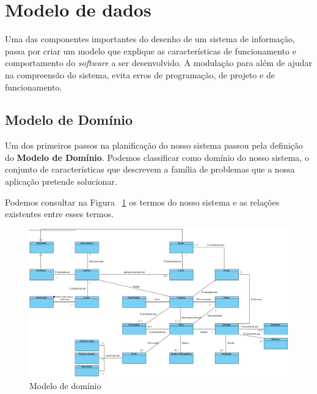 \section{Modelo de dados}

Uma das componentes importantes do desenho de um sistema de informação, passa por criar um modelo que explique as características de funcionamento e comportamento do \textit{software} a ser desenvolvido. A modulação para além de ajudar na compreensão do sistema, evita erros de programação, de projeto e de funcionamento.

\subsection{Modelo de Domínio}

Um dos primeiros passos na planificação do nosso sistema passou pela definição do \textbf{Modelo de Domínio}.
Podemos classificar como domínio do nosso sistema, o conjunto de características que descrevem a família de problemas que a nossa aplicação pretende solucionar.

Podemos consultar na Figura ~\ref{fig:modelo-dominio} os termos do nosso sistema e as relações existentes entre esses termos.

\begin{figure}[H] 
  \centering
  \includegraphics[width=1\textwidth,center]{images/modelo_dados/modelo-dominio}
  \caption{Modelo de domínio}
  \label{fig:modelo-dominio}
\end{figure}
